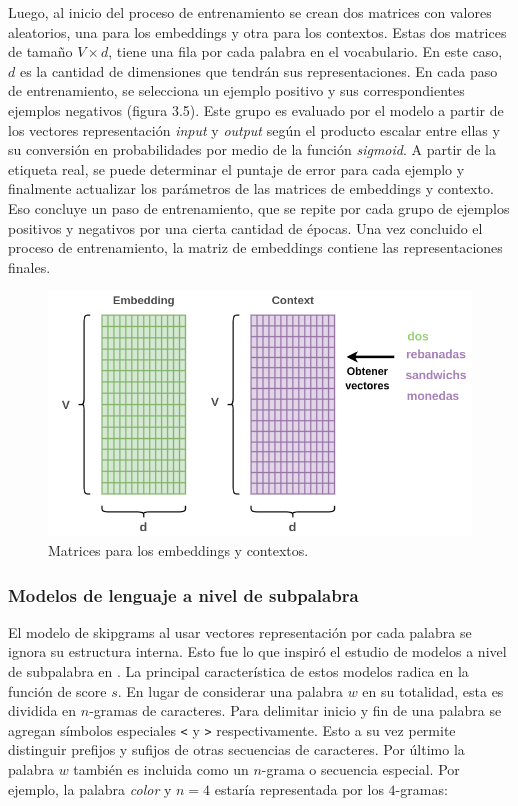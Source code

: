Luego, al inicio del proceso de entrenamiento se crean dos matrices con valores
aleatorios, una para los embeddings y otra para los contextos. Estas dos
matrices de tamaño $V \times d$, tiene una fila por cada palabra en el
vocabulario. En este caso, $d$ es la cantidad de dimensiones que tendrán sus
representaciones. En cada paso de entrenamiento, se selecciona un ejemplo
positivo y sus correspondientes ejemplos negativos (figura 3.5). Este grupo es
evaluado por el modelo a partir de los vectores representación \emph{input} y
\emph{output} según el producto escalar entre ellas y su conversión en
probabilidades por medio de la función \emph{sigmoid}. A partir de la etiqueta
real, se puede determinar el puntaje de error para cada ejemplo y finalmente
actualizar los parámetros de las matrices de embeddings y contexto. Eso concluye
un paso de entrenamiento, que se repite por cada grupo de ejemplos positivos y
negativos por una cierta cantidad de épocas. Una vez concluido el proceso de
entrenamiento, la matriz de embeddings contiene las representaciones finales.

\begin{figure}
    \centering
    \includegraphics[scale=0.5]{figures/context_example_4.png}
    \caption{Matrices para los embeddings y contextos.}
\end{figure}

\subsubsection{Modelos de lenguaje a nivel de subpalabra}

El modelo de skipgrams al usar vectores representación por cada palabra se
ignora su estructura interna. Esto fue lo que inspiró el estudio de modelos a
nivel de subpalabra en \citep{bojanowski-2017}. La principal característica de estos modelos
radica en la función de score $s$. En lugar de considerar una palabra $w$ en su
totalidad, esta es dividida en $n$-gramas de caracteres. Para delimitar inicio y
fin de una palabra se agregan símbolos especiales \verb|<| y \verb|>| respectivamente. Esto a
su vez permite distinguir prefijos y sufijos de otras secuencias de caracteres.
Por último la palabra $w$ también es incluida como un $n$-grama o secuencia
especial. Por ejemplo, la palabra \emph{color} y $n=4$ estaría representada por
los $4$-gramas:

